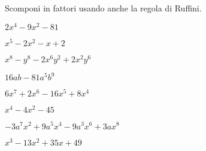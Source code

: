 

\begin{esercizio}[*]
\label{ese:17.24}
Scomponi in fattori usando anche la regola di Ruffini.
\begin{enumeratea}
\item \(2x^{4}-9x^{2}-81\)
\item \(x^{5}-2x^{2}-x+2\)
\item \(x^{8}-y^{8}-2x^{6}y^{2}+2x^{2}y^{6}\)
\item \(16ab-81a^{5}b^{9}\)
\item \(6x^{7}+2x^{6}-16x^{5}+8x^{4}\)
\item \(x^{4}-4x^{2}-45\)
\item \(-3a^{7}x^{2}+9a^{5}x^{4}-9a^{3}x^{6}+3ax^{8}\)
\item \(x^{3}-13x^{2}+35x+49\)
\end{enumeratea}
\end{esercizio}

